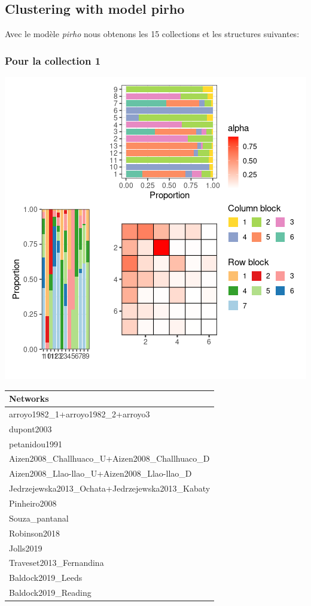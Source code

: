 \hypertarget{clustering-with-model-pirho}{%
\subsection{Clustering with model
pirho}\label{clustering-with-model-pirho}}

Avec le modèle \emph{pirho} nous obtenons les 15 collections et les
structures suivantes:

\subsubsection{Pour la collection 1 }

\includegraphics{./img/1b76f16cf61f19fcd2cd382227f1c1dafbdd86b8.png}\newline \tiny

\begin{tabular}{l}
\toprule
Networks\\
\midrule
arroyo1982\_1+arroyo1982\_2+arroyo3\\
dupont2003\\
petanidou1991\\
Aizen2008\_Challhuaco\_U+Aizen2008\_Challhuaco\_D\\
Aizen2008\_Llao-llao\_U+Aizen2008\_Llao-llao\_D\\
\addlinespace
Jedrzejewska2013\_Ochata+Jedrzejewska2013\_Kabaty\\
Pinheiro2008\\
Souza\_pantanal\\
Robinson2018\\
Jolls2019\\
\addlinespace
Traveset2013\_Fernandina\\
Baldock2019\_Leeds\\
Baldock2019\_Reading\\
\bottomrule
\end{tabular}

